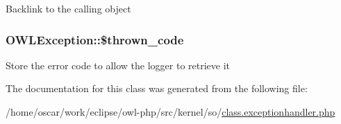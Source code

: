 Backlink to the calling object \hypertarget{classOWLException_bd34d579d5f578f2e08a04c987dbea1a}{
\subsubsection{\setlength{\rightskip}{0pt plus 5cm}OWLException::\$thrown\_\-code}}
\label{classOWLException_bd34d579d5f578f2e08a04c987dbea1a}


Store the error code to allow the logger to retrieve it 

The documentation for this class was generated from the following file:\begin{CompactItemize}
\item 
/home/oscar/work/eclipse/owl-php/src/kernel/so/\hyperlink{class_8exceptionhandler_8php}{class.exceptionhandler.php}\end{CompactItemize}
